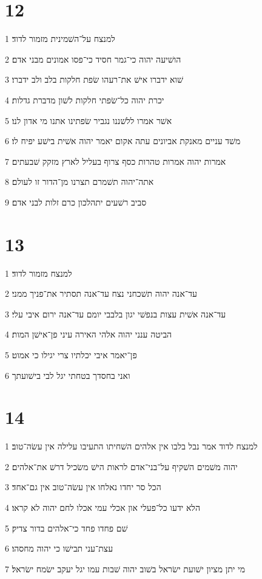 \chapter{12}

\par 1 למנצח על־השׁמינית מזמור לדוד׃
\par 2 הושׁיעה יהוה כי־גמר חסיד כי־פסו אמונים מבני אדם׃
\par 3 שׁוא ידברו אישׁ את־רעהו שׂפת חלקות בלב ולב ידברו׃
\par 4 יכרת יהוה כל־שׂפתי חלקות לשׁון מדברת גדלות׃
\par 5 אשׁר אמרו ללשׁננו נגביר שׂפתינו אתנו מי אדון לנו׃
\par 6 משׁד עניים מאנקת אביונים עתה אקום יאמר יהוה אשׁית בישׁע יפיח לו׃
\par 7 אמרות יהוה אמרות טהרות כסף צרוף בעליל לארץ מזקק שׁבעתים׃
\par 8 אתה־יהוה תשׁמרם תצרנו מן־הדור זו לעולם׃
\par 9 סביב רשׁעים יתהלכון כרם זלות לבני אדם׃

\chapter{13}

\par 1 למנצח מזמור לדוד׃
\par 2 עד־אנה יהוה תשׁכחני נצח עד־אנה תסתיר את־פניך ממני׃
\par 3 עד־אנה אשׁית עצות בנפשׁי יגון בלבבי יומם עד־אנה ירום איבי עלי׃
\par 4 הביטה ענני יהוה אלהי האירה עיני פן־אישׁן המות׃
\par 5 פן־יאמר איבי יכלתיו צרי יגילו כי אמוט׃
\par 6 ואני בחסדך בטחתי יגל לבי בישׁועתך

\chapter{14}

\par 1 למנצח לדוד אמר נבל בלבו אין אלהים השׁחיתו התעיבו עלילה אין עשׂה־טוב׃
\par 2 יהוה משׁמים השׁקיף על־בני־אדם לראות הישׁ משׂכיל דרשׁ את־אלהים׃
\par 3 הכל סר יחדו נאלחו אין עשׂה־טוב אין גם־אחד׃
\par 4 הלא ידעו כל־פעלי און אכלי עמי אכלו לחם יהוה לא קראו׃
\par 5 שׁם פחדו פחד כי־אלהים בדור צדיק׃
\par 6 עצת־עני תבישׁו כי יהוה מחסהו׃
\par 7 מי יתן מציון ישׁועת ישׂראל בשׁוב יהוה שׁבות עמו יגל יעקב ישׂמח ישׂראל׃

